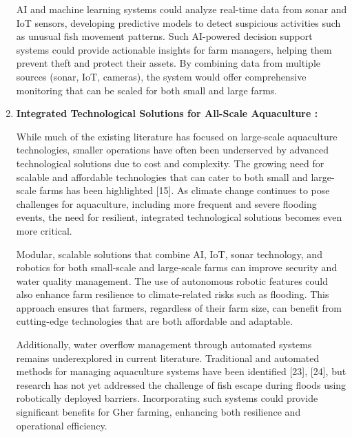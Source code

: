 \documentclass[conference]{IEEEtran}
\begin{document}
\begin{enumerate}
AI and machine learning systems could analyze real-time data from sonar and IoT sensors, developing predictive models to detect suspicious activities such as unusual fish movement patterns. Such AI-powered decision support systems could provide actionable insights for farm managers, helping them prevent theft and protect their assets. By combining data from multiple sources (sonar, IoT, cameras), the system would offer comprehensive monitoring that can be scaled for both small and large farms.

\item \textbf{Integrated Technological Solutions for All-Scale Aquaculture : }

While much of the existing literature has focused on large-scale aquaculture technologies, smaller operations have often been underserved by advanced technological solutions due to cost and complexity. The growing need for scalable and affordable technologies that can cater to both small and large-scale farms has been highlighted [15]. As climate change continues to pose challenges for aquaculture, including more frequent and severe flooding events, the need for resilient, integrated technological solutions becomes even more critical.

Modular, scalable solutions that combine AI, IoT, sonar technology, and robotics for both small-scale and large-scale farms can improve security and water quality management. The use of autonomous robotic features could also enhance farm resilience to climate-related risks such as flooding. This approach ensures that farmers, regardless of their farm size, can benefit from cutting-edge technologies that are both affordable and adaptable.

Additionally, water overflow management through automated systems remains underexplored in current literature. Traditional and automated methods for managing aquaculture systems have been identified [23], [24], but research has not yet addressed the challenge of fish escape during floods using robotically deployed barriers. Incorporating such systems could provide significant benefits for Gher farming, enhancing both resilience and operational efficiency.

\end{enumerate}
\end{document}

